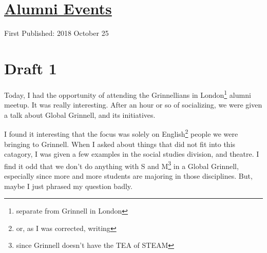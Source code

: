 \documentclass[12pt]{article}[titlepage]
\newcommand{\1}{\={a}}
\newcommand{\2}{\={e}}
\newcommand{\3}{\={\i}}
\newcommand{\4}{\=o}
\newcommand{\5}{\=u}
\newcommand{\6}{\={A}}
\renewcommand{\,}{\textsuperscript{,}}
\begin{document}
\doublespacing
\section{\href{alumni-events.html}{Alumni Events}}
First Published: 2018 October 25
\section{Draft 1}
Today, I had the opportunity of attending the Grinnellians in London\footnote{separate from Grinnell in London} alumni meetup.
It was really interesting.
After an hour or so of socializing, we were given a talk about Global Grinnell, and its initiatives.

I found it interesting that the focus was solely on English\footnote{or, as I was corrected, writing} people we were bringing to Grinnell.
When I asked about things that did not fit into this catagory, I was given a few examples in the social studies division, and theatre.
I find it odd that we don't do anything with S and M\footnote{since Grinnell doesn't have the TEA of STEAM} in a Global Grinnell, especially since more and more students are majoring in those disciplines.
But, maybe I just phrased my question badly.
\end{document}
